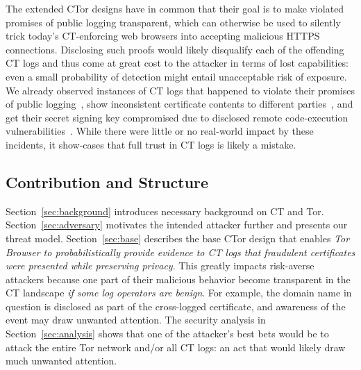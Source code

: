 The extended CTor designs have in common that their goal is to make violated
promises of public logging transparent, which can otherwise be used to silently trick
today's CT-enforcing web browsers into accepting malicious HTTPS connections.
Disclosing such proofs would likely disqualify each of the offending CT logs and
thus come at great cost to the attacker in terms of lost capabilities:
	even a small probability of detection might entail unacceptable risk of
	exposure.
We already observed instances of CT logs that happened to
	violate their promises of public logging~\cite{gdca1-omission},
	show inconsistent certificate contents to different
		parties~\cite{izenpe-disqualified,venafi-disqualified}, and
	get their secret signing key compromised due to disclosed remote
		code-execution vulnerabilities~\cite{digicert-log-compromised}. 
While there were little or no real-world impact by these incidents, it
show-cases that full trust in CT logs is likely a mistake.

\subsection{Contribution and Structure}
Section~\ref{sec:background} introduces necessary background on CT and Tor.
Section~\ref{sec:adversary} motivates the intended attacker further and presents
our threat model.
Section~\ref{sec:base} describes the base CTor design that enables
	\emph{Tor Browser to probabilistically provide evidence to CT logs that
	fraudulent certificates were presented while preserving privacy}.
This greatly impacts risk-averse attackers because one part of their malicious
behavior become transparent in the CT landscape \emph{if some log operators are
benign}.  For example, the domain name in question is disclosed as part of the
cross-logged certificate, and awareness of the event may draw unwanted
attention.  The security analysis in Section~\ref{sec:analysis} shows that one
of the attacker's best bets would be to attack the entire Tor network and/or all
CT logs:
	an act that would likely draw much unwanted attention.

